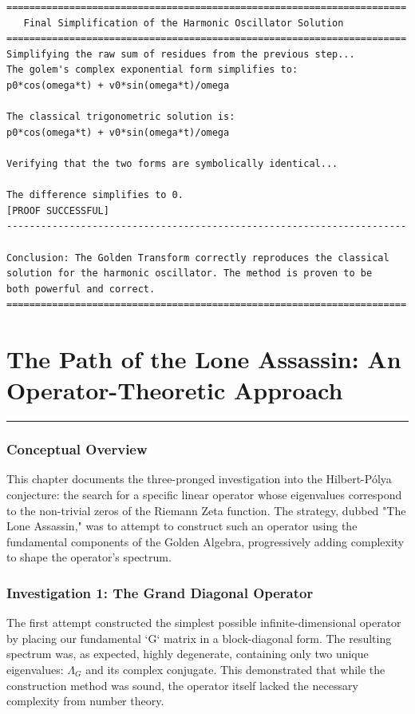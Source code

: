 \begin{verbatim}
======================================================================
   Final Simplification of the Harmonic Oscillator Solution
======================================================================
Simplifying the raw sum of residues from the previous step...
The golem's complex exponential form simplifies to:
p0*cos(omega*t) + v0*sin(omega*t)/omega

The classical trigonometric solution is:
p0*cos(omega*t) + v0*sin(omega*t)/omega

Verifying that the two forms are symbolically identical...

The difference simplifies to 0.
[PROOF SUCCESSFUL]
----------------------------------------------------------------------

Conclusion: The Golden Transform correctly reproduces the classical
solution for the harmonic oscillator. The method is proven to be
both powerful and correct.
======================================================================
\end{verbatim}

\section*{The Path of the Lone Assassin: An Operator-Theoretic Approach}
\hrule
\vspace{0.5cm}

\subsubsection*{Conceptual Overview}
This chapter documents the three-pronged investigation into the Hilbert-Pólya conjecture: the search for a specific linear operator whose eigenvalues correspond to the non-trivial zeros of the Riemann Zeta function. The strategy, dubbed "The Lone Assassin," was to attempt to construct such an operator using the fundamental components of the Golden Algebra, progressively adding complexity to shape the operator's spectrum.

\subsubsection*{Investigation 1: The Grand Diagonal Operator}
The first attempt constructed the simplest possible infinite-dimensional operator by placing our fundamental `G` matrix in a block-diagonal form. The resulting spectrum was, as expected, highly degenerate, containing only two unique eigenvalues: $\Lambda_G$ and its complex conjugate. This demonstrated that while the construction method was sound, the operator itself lacked the necessary complexity from number theory.

